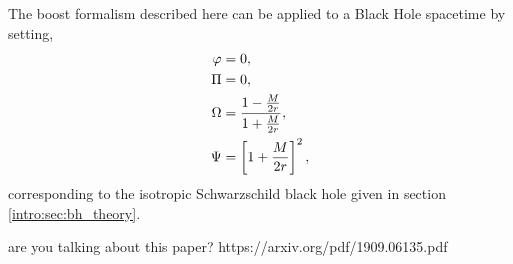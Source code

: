 The boost formalism described here can be applied to a Black Hole spacetime by setting, 
\begin{align} 
\varphi&=0,\\
\Pi&=0,\\
\Omega &= \frac{1-\frac{M}{2r}}{1+\frac{M}{2r}}, \\
 \Psi &= \left[1+\frac{M}{2r}\right]^2,
 \end{align}
 corresponding to the isotropic Schwarzschild black hole given in section \ref{intro:sec:bh_theory}.

 \color{choral} are you talking about this paper? https://arxiv.org/pdf/1909.06135.pdf \color{black}
 

 
